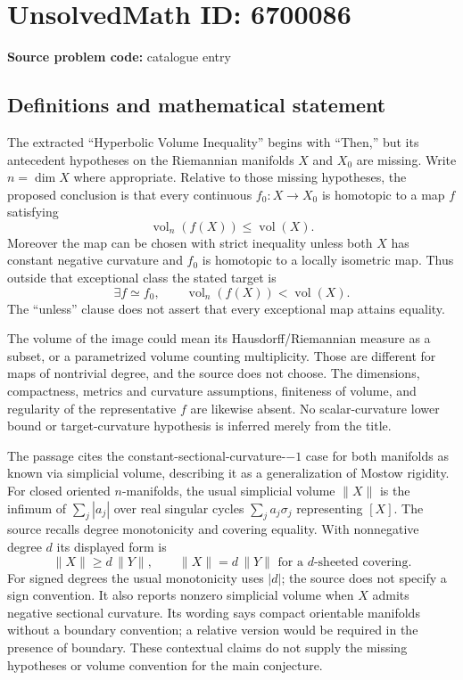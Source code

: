 \documentclass[11pt]{article}
\begin{document}
\section*{UnsolvedMath ID: 6700086}
\textbf{Source problem code:} catalogue entry
\subsection{Definitions and mathematical statement}
The extracted ``Hyperbolic Volume Inequality'' begins with ``Then,'' but its antecedent hypotheses on the Riemannian manifolds $X$ and $X_0$ are missing. Write $n=\dim X$ where appropriate. Relative to those missing hypotheses, the proposed conclusion is that every continuous $f_0:X\to X_0$ is homotopic to a map $f$ satisfying
\[
 \operatorname{vol}_n(f(X))\le\operatorname{vol}(X).
\]
Moreover the map can be chosen with strict inequality unless both $X$ has constant negative curvature and $f_0$ is homotopic to a locally isometric map. Thus outside that exceptional class the stated target is
\[
 \exists f\simeq f_0,\qquad
 \operatorname{vol}_n(f(X))<\operatorname{vol}(X).
\]
The ``unless'' clause does not assert that every exceptional map attains equality.

The volume of the image could mean its Hausdorff/Riemannian measure as a subset, or a parametrized volume counting multiplicity. Those are different for maps of nontrivial degree, and the source does not choose. The dimensions, compactness, metrics and curvature assumptions, finiteness of volume, and regularity of the representative $f$ are likewise absent. No scalar-curvature lower bound or target-curvature hypothesis is inferred merely from the title.

The passage cites the constant-sectional-curvature-$-1$ case for both manifolds as known via simplicial volume, describing it as a generalization of Mostow rigidity. For closed oriented $n$-manifolds, the usual simplicial volume $\|X\|$ is the infimum of $\sum_j|a_j|$ over real singular cycles $\sum_ja_j\sigma_j$ representing $[X]$. The source recalls degree monotonicity and covering equality. With nonnegative degree $d$ its displayed form is
\[
 \|X\|\ge d\,\|Y\|,
 \qquad \|X\|=d\,\|Y\|
       \text{ for a }d\text{-sheeted covering}.
\]
For signed degrees the usual monotonicity uses $|d|$; the source does not specify a sign convention. It also reports nonzero simplicial volume when $X$ admits negative sectional curvature. Its wording says compact orientable manifolds without a boundary convention; a relative version would be required in the presence of boundary. These contextual claims do not supply the missing hypotheses or volume convention for the main conjecture.
\end{document}
